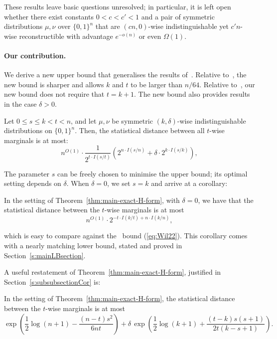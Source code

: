 \documentclass[manuscript,nonacm]{acmart}
\begin{document}
These results leave basic questions unresolved; in particular, it is left open whether there exist constants $0<c<c'<1$ and a pair of symmetric distributions $\mu,\nu$ over $\{0,1\}^n$ that are $(cn,0)$-wise indistinguishable yet $c'n$-wise reconstructible with advantage $e^{-o(n)}$ or even $\Omega(1)$. 

\paragraph{Our contribution.}
We derive a new upper bound that generalises the results of~\cite{bogdanov2019approximate,williamson2021sharp}. Relative to~\cite{bogdanov2019approximate}, the new bound is sharper and allows $k$ and $t$ to be larger than $n/64$. Relative to~\cite{williamson2021sharp}, our new bound does not require that $t=k+1$. The new bound also provides results in the case $\delta>0$.  
\begin{theorem}
\label{thm:main-exact-H-form}
Let \(0\le s\le k<t< n\), and let \(\mu,\nu\) be symmetric
\((k,\delta)\)-wise indistinguishable distributions on \(\{0,1\}^n\).
Then, the statistical distance between all $t$-wise marginals is at most:
\[
    n^{O(1)}\cdot \frac{1}{2^{t\cdot I(s/t)}}\left( 2^{n\cdot I(s/n)}+\delta \cdot 2^{k\cdot I(s/k)}\right),
\]
\end{theorem}
The parameter $s$ can be freely chosen to minimise the upper bound; its optimal setting depends on $\delta$. When $\delta=0$, we set $s=k$ and arrive at a corollary:
\begin{corollary}
In the setting of Theorem~\ref{thm:main-exact-H-form}, with $\delta=0$, we have that the statistical distance between the $t$-wise marginals is at most
\[
    n^{O(1)}\cdot 2^{-t\cdot I(k/t)+n\cdot I(k/n)},
\]
\end{corollary}
which is easy to compare against the~\cite{williamson2021sharp} bound (\ref{eq:Wil22}). This corollary comes with a nearly matching lower bound, stated and proved in Section~\ref{s:mainLBsection}.

A useful restatement of Theorem~\ref{thm:main-exact-H-form}, justified in Section~\ref{s:subsubsectionCor} is:
\begin{corollary}
\label{cor:main-cor-delta}
In the setting of Theorem~\ref{thm:main-exact-H-form}, the statistical distance between the $t$-wise marginals is at most
\begin{equation}
\label{eq:working-approx-bound}
    \exp\!\left(
        \frac12\log(n+1)
        -
        \frac{(n-t)s^2}{6nt}
    \right)
    +
    \delta\,\exp\!\left(\frac12\log(k+1)+
        \frac{(t-k)s(s+1)}
             {2t(k-s+1)}
    \right).
\end{equation}
\end{corollary}
\end{document}
